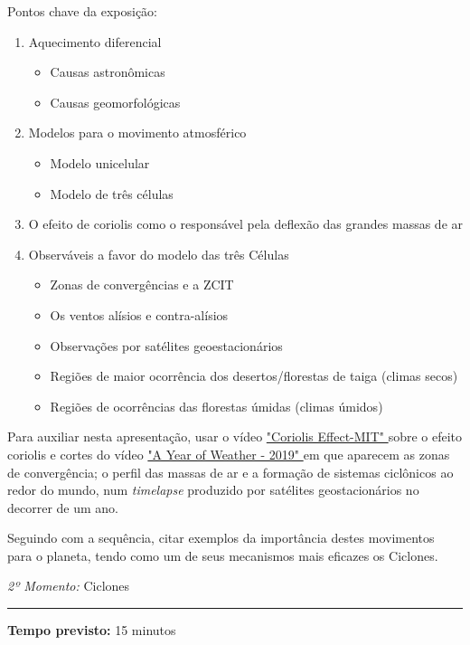 \documentclass[
12pt,				%
openright,			%
oneside,			%
a4paper,			%
chapter=TITLE,		%
english,			%
brazil				%
]{abntex2}
\begin{document}
Pontos chave da exposição:
\begin{enumerate}[label=\alph *)]
		\item Aquecimento diferencial
			\begin{itemize}
					\item Causas astronômicas
					\item Causas geomorfológicas
			\end{itemize}
		\item Modelos para o movimento atmosférico
			\begin{itemize}
					\item Modelo unicelular
					\item Modelo de três células
			\end{itemize}
		\item O efeito de coriolis como o responsável pela deflexão das grandes massas de ar
		\item Observáveis a favor do modelo das três Células
			\begin{itemize}
					\item Zonas de convergências e a ZCIT
					\item Os ventos alísios e contra-alísios
					\item Observações por satélites geoestacionários
					\item Regiões de maior ocorrência dos desertos/florestas de taiga (climas secos)
					\item Regiões de ocorrências das florestas úmidas (climas úmidos)
			\end{itemize}
\end{enumerate}
Para auxiliar nesta apresentação, usar o vídeo \href{https://youtu.be/dt_XJp77-mk}{"Coriolis Effect-MIT" }sobre o efeito coriolis e cortes do vídeo \href{https://youtu.be/8w3o6_cn-O8}{"A Year of Weather - 2019" }em que aparecem as zonas de convergência; o perfil das massas de ar e a formação de sistemas ciclônicos ao redor do mundo, num \textit{timelapse} produzido por satélites geostacionários no decorrer de um ano.

Seguindo com a sequência, citar exemplos da importância destes movimentos para o planeta, tendo como um de seus mecanismos mais eficazes os Ciclones.

\vspace{50pt}
\par\noindent\emph{2º Momento:} Ciclones
\par\noindent\rule{.3\textwidth}{.5pt}    
\par\noindent\textbf{Tempo previsto:} 15 minutos
\end{document}
